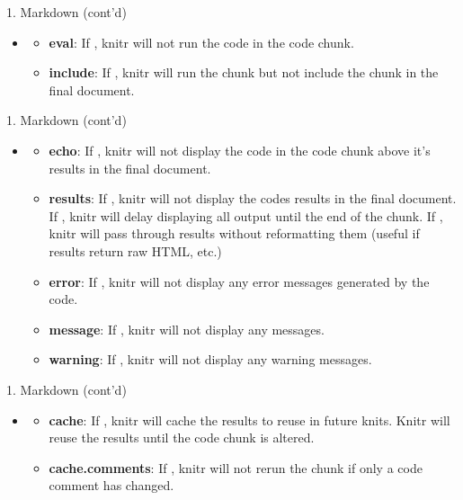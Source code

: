 \documentclass[14pt, aspectratio=169, sectionpage=simple, xclolor=table]{beamer}
\begin{document}
\begin{frame}[fragile]{1. Markdown (cont'd)}
\begin{itemize}
\item {}
\begin{itemize}
\item \textbf{eval}: If , knitr will not run the code in the code chunk.
\item \textbf{include}: If , knitr will run the chunk but not include the chunk in the final document.
\end{itemize}
\end{itemize}




\end{frame}
\begin{frame}{1. Markdown (cont'd)}
\begin{itemize}
\item {}
\begin{itemize}
\item \textbf{echo}: If , knitr will not display the code in the code chunk above it's results in the final document.
\item \textbf{results}: If , knitr will not display the codes results in the final document. If , knitr will delay displaying all output until the end of the chunk. If , knitr will pass through results without reformatting them (useful if results return raw HTML, etc.)
\item \textbf{error}: If , knitr will not display any error messages generated by the code.
\item \textbf{message}: If , knitr will not display any messages.
\item \textbf{warning}: If , knitr will not display any warning messages.
\end{itemize}
\end{itemize}

\end{frame}
\begin{frame}[fragile]{1. Markdown (cont'd)}
\begin{itemize}
\item {}
\begin{itemize}
\item \textbf{cache}: If , knitr will cache the results to reuse in future knits. Knitr will reuse the results until the code chunk is altered.
\item \textbf{cache.comments}: If , knitr will not rerun the chunk if only a code comment has changed.
\end{itemize}
\end{itemize}


\end{frame}
\end{document}
